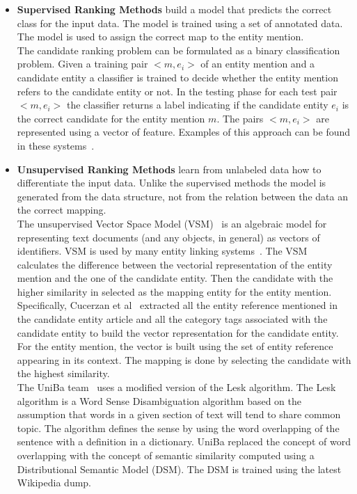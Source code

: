 \begin{itemize}[topsep=10pt]
\item \textbf{Supervised Ranking Methods} build a model that predicts the correct class for the input data. The model is trained using a set of annotated data. The model is used to assign the correct map to the entity mention.\\
\- \- \- The candidate ranking problem can be formulated as a binary classification problem. Given a training pair $<\!\!m, e_i\!\!>$ of an entity mention and a candidate entity a classifier is trained to decide whether the entity mention refers to the candidate entity or not. In the testing phase for each test pair $<\!\!m, e_i\!\!>$ the classifier returns a label indicating if the candidate entity $e_i$ is the correct candidate for the entity mention $m$. The pairs $<\!\!m, e_i\!\!>$ are represented using a vector of feature. Examples of this approach can be found in these systems~\cite{hoffart2011robust, guo2013link}.

\item \textbf{Unsupervised Ranking Methods} learn from unlabeled data how to differentiate the input data. Unlike the supervised methods the model is generated from the data structure, not from the relation between the data an the correct mapping.\\
\- \- The unsupervised Vector Space Model (VSM)~\cite{salton1975vector} is an algebraic model for representing text documents (and any objects, in general) as vectors of identifiers. VSM is used by many entity linking systems~\cite{cucerzan2007large}. The VSM calculates the difference between the vectorial representation of the entity mention and the one of the candidate entity. Then the candidate with the higher similarity in selected as the mapping entity for the entity mention. Specifically, Cucerzan et al~\cite{cucerzan2007large} extracted all the entity reference mentioned in the candidate entity article and all the category tags associated with the candidate entity to build the vector representation for the candidate entity. For the entity mention, the vector is built using the set of entity reference appearing in its context. The mapping is done by selecting the candidate with the highest similarity.\\
\- \- The UniBa team~\cite{basile2015uniba} uses a modified version of the Lesk algorithm. The Lesk algorithm is a Word Sense Disambiguation algorithm based on the assumption that words in a given section of text will tend to share common topic. The algorithm defines the sense by using the word overlapping of the sentence with a definition in a dictionary. UniBa replaced the concept of word overlapping with the concept of semantic similarity computed using a Distributional Semantic Model (DSM). The DSM is trained using the latest Wikipedia dump.
\end{itemize}

